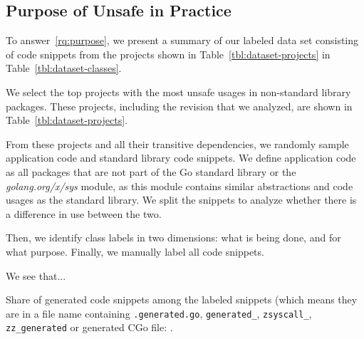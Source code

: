


\subsection{Purpose of Unsafe in Practice}

To answer~\ref{rq:purpose}, we present a summary of our labeled data set consisting of  code snippets from the  projects shown in Table~\ref{tbl:dataset-projects} in Table~\ref{tbl:dataset-classes}.



We select the top  projects with the most unsafe usages in non-standard library packages.
These projects, including the revision that we analyzed, are shown in Table~\ref{tbl:dataset-projects}.

From these projects and all their transitive dependencies, we randomly sample  application code and  standard library code snippets. We define application code as all packages that are not part of the Go standard library or the \textit{golang.org/x/sys} module, as this module contains similar abstractions and code usages as the standard library. We split the snippets to analyze whether there is a difference in use between the two.

Then, we identify class labels in two dimensions: what is being done, and for what purpose. Finally, we manually label all  code snippets.



We see that...

Share of generated code snippets among the  labeled snippets (which means they are in a file name containing \texttt{.generated.go}, \texttt{generated\_}, \texttt{zsyscall\_}, \texttt{zz\_generated} or generated CGo file: .